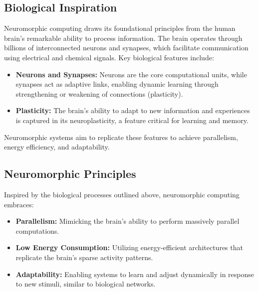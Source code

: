 \documentclass{article}
\theoremstyle{plain}
\begin{document}
\begin{itemize}
\begin{itemize}
\subsection{Biological Inspiration}
Neuromorphic computing draws its foundational principles from the human brain's remarkable ability to process information. The brain operates through billions of interconnected neurons and synapses, which facilitate communication using electrical and chemical signals. Key biological features include:
\begin{itemize}
    \item \textbf{Neurons and Synapses:} Neurons are the core computational units, while synapses act as adaptive links, enabling dynamic learning through strengthening or weakening of connections (plasticity).
    \item \textbf{Plasticity:} The brain's ability to adapt to new information and experiences is captured in its neuroplasticity, a feature critical for learning and memory.
\end{itemize}
Neuromorphic systems aim to replicate these features to achieve parallelism, energy efficiency, and adaptability.

\subsection{Neuromorphic Principles}
Inspired by the biological processes outlined above, neuromorphic computing embraces:
\begin{itemize}
    \item \textbf{Parallelism:} Mimicking the brain's ability to perform massively parallel computations.
    \item \textbf{Low Energy Consumption:} Utilizing energy-efficient architectures that replicate the brain's sparse activity patterns.
    \item \textbf{Adaptability:} Enabling systems to learn and adjust dynamically in response to new stimuli, similar to biological networks.
\end{itemize}


\end{itemize}
\end{itemize}
\end{document}
